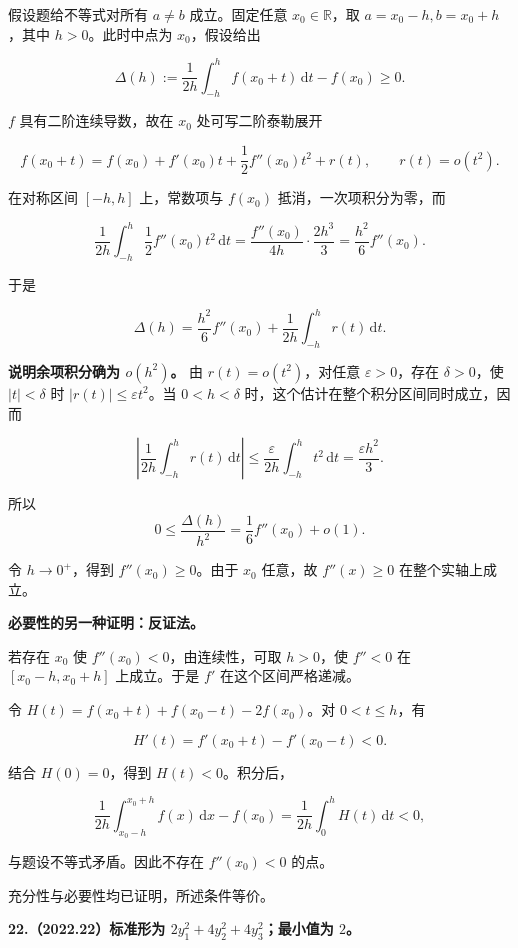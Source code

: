 \documentclass[UTF8,11pt,fontset=windows]{ctexart}
\begin{document}
假设题给不等式对所有 $a\ne b$ 成立。固定任意 $x_0\in\mathbb R$，取 $a=x_0-h,b=x_0+h$，其中 $h>0$。此时中点为 $x_0$，假设给出

$$
\Delta(h):=\frac1{2h}\int_{-h}^{h}f(x_0+t)\,\mathrm dt-f(x_0)\ge0.
$$

$f$ 具有二阶连续导数，故在 $x_0$ 处可写二阶泰勒展开

$$
f(x_0+t)=f(x_0)+f'(x_0)t+\frac12f''(x_0)t^2+r(t),
\qquad r(t)=o(t^2).
$$

在对称区间 $[-h,h]$ 上，常数项与 $f(x_0)$ 抵消，一次项积分为零，而

$$
\frac1{2h}\int_{-h}^{h}\frac12f''(x_0)t^2\,\mathrm dt
=\frac{f''(x_0)}{4h}\cdot\frac{2h^3}{3}
=\frac{h^2}{6}f''(x_0).
$$

于是

$$
\Delta(h)=\frac{h^2}{6}f''(x_0)+\frac1{2h}\int_{-h}^{h}r(t)\,\mathrm dt.
$$

\textbf{说明余项积分确为 $o(h^2)$。} 由 $r(t)=o(t^2)$，对任意 $\varepsilon>0$，存在 $\delta>0$，使 $|t|<\delta$ 时 $|r(t)|\le\varepsilon t^2$。当 $0<h<\delta$ 时，这个估计在整个积分区间同时成立，因而

$$
\left|\frac1{2h}\int_{-h}^{h}r(t)\,\mathrm dt\right|
\le\frac{\varepsilon}{2h}\int_{-h}^{h}t^2\,\mathrm dt
=\frac{\varepsilon h^2}{3}.
$$

所以
$$
0\le\frac{\Delta(h)}{h^2}
=\frac16f''(x_0)+o(1).
$$

令 $h\to0^+$，得到 $f''(x_0)\ge0$。由于 $x_0$ 任意，故 $f''(x)\ge0$ 在整个实轴上成立。

\textbf{必要性的另一种证明：反证法。}

若存在 $x_0$ 使 $f''(x_0)<0$，由连续性，可取 $h>0$，使 $f''<0$ 在 $[x_0-h,x_0+h]$ 上成立。于是 $f'$ 在这个区间严格递减。

令 $H(t)=f(x_0+t)+f(x_0-t)-2f(x_0)$。对 $0<t\le h$，有

$$
H'(t)=f'(x_0+t)-f'(x_0-t)<0.
$$

结合 $H(0)=0$，得到 $H(t)<0$。积分后，

$$
\frac1{2h}\int_{x_0-h}^{x_0+h}f(x)\,\mathrm dx-f(x_0)
=\frac1{2h}\int_0^h H(t)\,\mathrm dt<0,
$$

与题设不等式矛盾。因此不存在 $f''(x_0)<0$ 的点。

充分性与必要性均已证明，所述条件等价。

\clearpage

\textbf{22.（2022.22）标准形为 $2y_1^2+4y_2^2+4y_3^2$；最小值为 $2$。}
\end{document}

